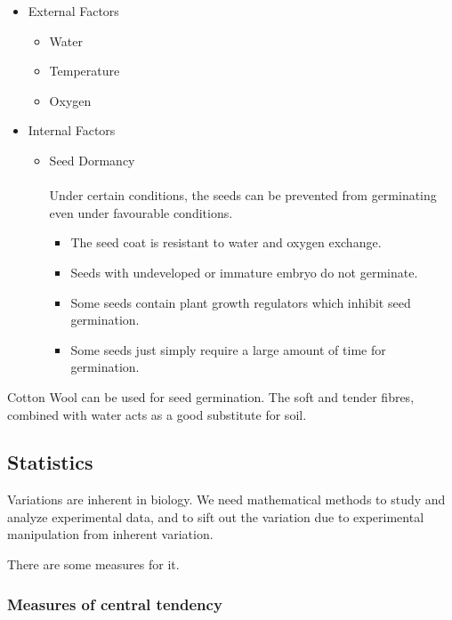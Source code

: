 \documentclass[twocolumn]{article}
\begin{document}
\begin{itemize}
    \item External Factors
    \begin{itemize}
        \item Water 
        \item Temperature 
        \item Oxygen  
    \end{itemize}
    \item Internal Factors
    \begin{itemize}
        \item Seed Dormancy \\ \\
        Under certain conditions, the seeds can be prevented from germinating even under favourable conditions.
        \begin{itemize}
        \item The seed coat is resistant to water and oxygen exchange.
        \item Seeds with undeveloped or immature embryo do not germinate.
        \item Some seeds contain plant growth regulators which inhibit seed germination.
        \item Some seeds just simply require a large amount of time for germination.
        \end{itemize}
    \end{itemize}
\end{itemize}

Cotton Wool can be used for seed germination. The soft and tender fibres, combined with water acts as a good substitute for soil.

\subsection{Statistics}

Variations are inherent in biology. We need mathematical methods to study and analyze experimental data, and to sift out the variation due to experimental manipulation from inherent variation.

There are some measures for it.

\subsubsection{Measures of central tendency}
\end{document}
